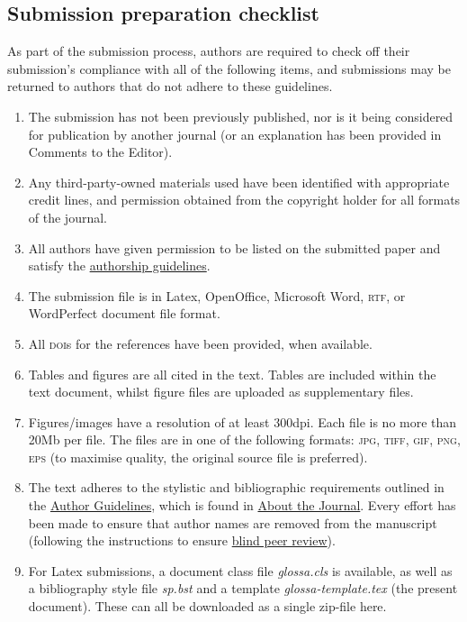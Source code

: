 \documentclass[charis,linguex]{glossa}
\begin{document}
\subsection{Submission preparation checklist}

As part of the submission process, authors are required to check off their submission's compliance with all of the following items, and submissions may be returned to authors that do not adhere to these guidelines.

\begin{enumerate}[label=\arabic*.]
\item The submission has not been previously published, nor is it being considered for publication by another journal (or an explanation has been provided in Comments to the Editor).
\item Any third-party-owned materials used have been identified with appropriate credit lines, and permission obtained from the copyright holder for all formats of the journal.
\item All authors have given permission to be listed on the submitted paper and satisfy the \href{http://glossa.ubiquitypress.com/about/authorship/}{authorship guidelines}. 
\item The submission file is in Latex, OpenOffice, Microsoft Word, \textsc{rtf}, or WordPerfect document file format.
\item All \textsc{doi}s for the references have been provided, when available.
\item Tables and figures are all cited in the text. Tables are included within the text document, whilst figure files are uploaded as supplementary files.
\item Figures/images have a resolution of at least 300dpi. Each file is no more than 20Mb per file. The files are in one of the following formats: \textsc{jpg, tiff, gif, png, eps} (to maximise quality, the original source file is preferred).
\item The text adheres to the stylistic and bibliographic requirements outlined in the \href{http://glossa.ubiquitypress.com/about/submissions/\#authorGuidelines}{Author Guidelines}, which is found in \href{http://glossa.ubiquitypress.com/about/}{About the Journal}. Every effort has been made to ensure that author names are removed from the manuscript (following the instructions to ensure \href{http://glossa.ubiquitypress.com/help/view/editorial/topic/000044/}{blind peer review}).
\item For Latex submissions, a document class file \textit{glossa.cls} is available, as well as a bibliography style file \textit{sp.bst} and a template \textit{glossa-template.tex} (the present document). These can all be downloaded as a single zip-file here.
\end{enumerate}
\end{document}
